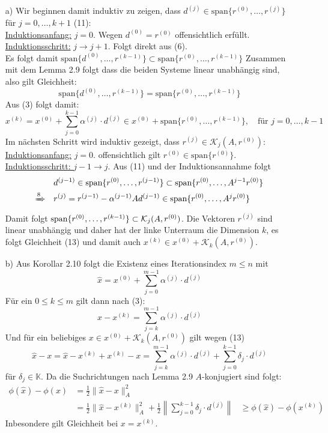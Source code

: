     \begin{enumerate}
        \item[a)] Wir beginnen damit induktiv zu zeigen, dass $d^{(j)}\in\text{span}\{r^{(0)}, \dotsc, r^{(j)}\}$ 
        für $j=0,\dotsc,k+1$ (11): \\
        \underline{Induktionsanfang:} $j=0$. Wegen $d^{(0)}=r^{(0)}$ offensichtlich erfüllt.  \\
        \underline{Induktionsschritt:} $j\rightarrow j+1$. Folgt direkt aus (6). \\
        Es folgt damit $\text{span}\{d^{(0)}, \dotsc, r^{(k-1)}\}\subset\text{span}\{r^{(0)}, \dotsc, r^{(k-1)}\}$
        Zusammen mit dem Lemma 2.9 folgt dass die beiden Systeme linear unabhängig sind, also gilt Gleichheit:
        \[\text{span}\{d^{(0)}, \dotsc, r^{(k-1)}\} = \text{span}\{r^{(0)}, \dotsc, r^{(k-1)}\} \tag{12}\]
        Aus (3) folgt damit:
        \[x^{(k)} = x^{(0)} + \sum_{j=0}^{k-1} \alpha^{(j)}\cdot d^{(j)} 
        \in x^{(0)} + \text{span}\{r^{(0)}, \dotsc, r^{(k-1)}\},\quad\text{für } j=0,\dotsc,k-1\]
        Im nächsten Schritt wird induktiv gezeigt, dass $r^{(j)}\in \mathcal{K}_j(A,r^{(0)})$: \\
        \underline{Induktionsanfang:} $j=0$. offensichtlich gilt $r^{(0)}\in\text{span}\{r^{(0)}\}$. \\
        \underline{Induktionsschritt: } $j-1\rightarrow j$. Aus (11) und der Induktionsannahme folgt 
        \begin{align*}
        &d^{(j-1)}\in\text{span}\{r^{(0)}, \dotsc, r^{(j-1)}\}\subset \text{span}\{r^{(0)}, \dotsc, A^{j-1}r^{(0)}\}\\
        \xRightarrow{8}\quad& r^{(j)} = r^{(j-1)}-\alpha^{(j-1)}Ad^{(j-1)}
        \in \text{span}\{r^{(0)}, \dotsc, A^{j}r^{(0)}\}
        \end{align*}
        Damit folgt $\text{span}\{r^{(0)},\dotsc,r^{(k-1)}\}\subset \mathcal{K}_j(A,r^{(0)})$. 
        Die Vektoren $r^{(j)}$ sind linear unabhängig und daher hat der linke Unterraum die Dimension $k$, 
        es folgt Gleichheit (13) und damit auch $x^{(k)}\in x^{(0)} + \mathcal{K}_k(A,r^{(0)})$.
        \item[b)] Aus Korollar 2.10 folgt die Existenz eines Iterationsindex $m\leq n$ mit 
        \[\hat{x} = x^{(0)} + \sum_{j=0}^{m-1} \alpha^{(j)}\cdot d^{(j)}\]
        Für ein $0\leq k\leq m$ gilt dann nach (3):
        \[\hat{x}-x^{(k)} = \sum_{j=k}^{m-1} \alpha^{(j)}\cdot d^{(j)}\]
        Und für ein beliebiges $x\in x^{(0)} + \mathcal{K}_k(A,r^{(0)})$ gilt wegen (13)
        \[\hat{x}-x = \hat{x}-x^{(k)}+x^{(k)}-x = 
        \sum_{j=k}^{m-1}\alpha^{(j)}\cdot d^{(j)} + \sum_{j=0}^{k-1}\delta_j\cdot d^{(j)}\]
        für $\delta_j\in\mathbb{K}$. Da die Suchrichtungen nach Lemma 2.9 $A$-konjugiert sind folgt:
        \begin{align*}
            \phi(\hat{x})-\phi(x) &= \tfrac{1}{2}\|\hat{x}-x\|_A^2 \\
            &= \tfrac{1}{2}\|\hat{x}-x^{(k)}\|_A^2 + \tfrac{1}{2}\left\|\sum_{j=0}^{k-1}\delta_j\cdot d^{(j)}\right\|
            &\geq \phi(\hat{x})-\phi(x^{(k)}) 
        \end{align*}
        Inbesondere gilt Gleichheit bei $x=x^{(k)}$.
    \end{enumerate}

